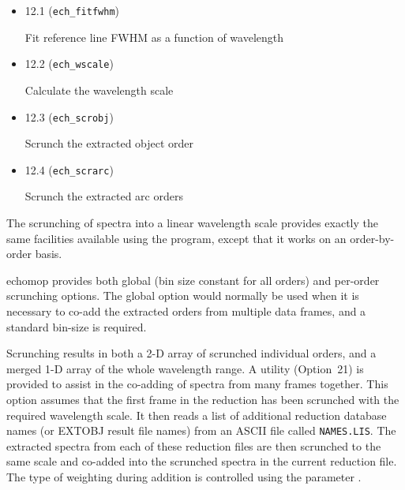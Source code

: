 \begin{itemize}

\item {} {12.1} ({\tt{ech\_fitfwhm}})

      Fit reference line FWHM as a function of wavelength

\item {} {12.2} ({\tt{ech\_wscale}})

      Calculate the wavelength scale

\item {} {12.3} ({\tt{ech\_scrobj}})

      Scrunch the extracted object order

\item {} {12.4} ({\tt{ech\_scrarc}})

      Scrunch the extracted arc  orders

\end{itemize}

The scrunching of spectra into a linear wavelength scale provides exactly
the same facilities available using the 
 program, except that it works on an
order-by-order basis.

{\sc echomop} provides both global (bin size constant for all orders) and
per-order scrunching options. The global option would normally be used when
it is necessary to co-add the extracted orders from multiple data frames,
and a standard bin-size is required.

Scrunching results in both a 2-D array of scrunched individual orders, and a
merged 1-D array of the whole wavelength range.
A utility (Option~21) is provided to assist in the co-adding of spectra
from many frames together. This option assumes that the first frame in the
reduction has been scrunched with the required wavelength scale. It then
reads a list of additional reduction database names (or EXTOBJ result
file names) from an ASCII file called {\tt NAMES.LIS}. The extracted
spectra from each of these reduction files are then scrunched to the same
scale and co-added into the scrunched spectra in the current reduction
file. The type of weighting during addition is controlled using the
parameter \@.

